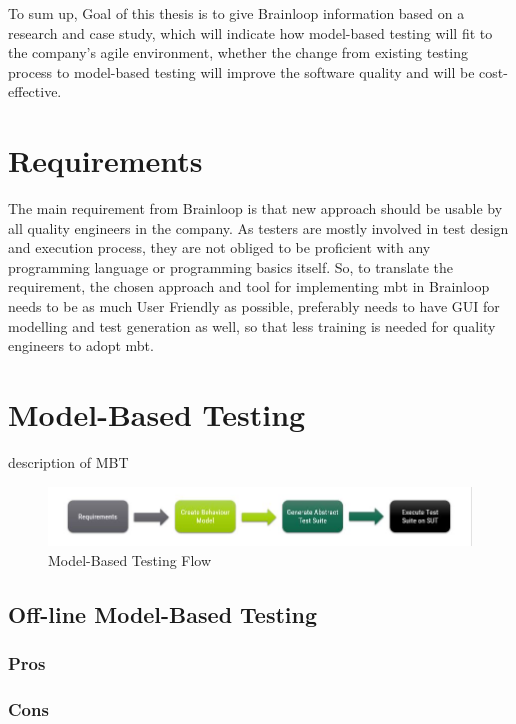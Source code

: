\par
To sum up, Goal of this thesis is to give Brainloop information based on a research and case study, which will indicate how model-based testing will fit to the company’s agile environment, whether the change from existing testing process to model-based testing will improve the software quality and will be cost-effective.

\section{Requirements}

\par
The main requirement from Brainloop is that new approach should be usable by all quality engineers in the company. As testers are mostly involved in test design and execution process, they are not obliged to be proficient with any programming language or programming basics itself. So, to translate the requirement, the chosen approach and tool for implementing \acrlong{mbt} in Brainloop needs to be as much User Friendly as possible, preferably needs to have GUI for modelling and test generation as well, so that less training is needed for quality engineers to adopt \acrlong{mbt}.

\section{Model-Based Testing}


\par
description of MBT


\begin{figure} [htbp!]
	\centering
					\includegraphics[width=1.1\textwidth]{figures/MBT_Flow.JPG}
					\caption{\label{Fig:MBT_Flow} Model-Based Testing Flow}
\end{figure}

\subsection{Off-line Model-Based Testing}
\subsubsection{Pros}
\subsubsection{Cons}
